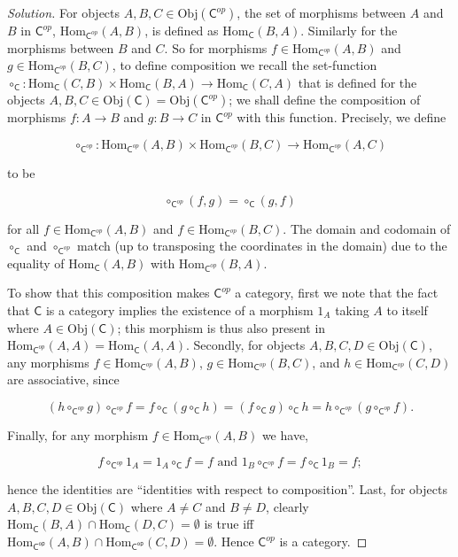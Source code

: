 \documentclass[fontsize=14pt]{scrartcl}
\newenvironment{solution}{
  \begin{proof}[Solution]
  \vspace{-8px}
  \setlength{\parskip}{4px}
  \setlength{\parindent}{0px}
}{
  \end{proof}
}
\newcommand{\Obj}{\mathrm{Obj}}
\newcommand{\Hom}{\mathrm{Hom}}
\begin{document}
\begin{solution}
For objects $A,B,C\in\Obj(\mathsf{C}^{op})$, the set of morphisms between $A$
and $B$ in $\mathsf{C}^{op}$, $\Hom_{\mathsf{C}^{op}}(A,B)$, is defined as
$\Hom_{\mathsf{C}}(B, A)$. Similarly for the morphisms between $B$ and $C$. So
for morphisms $f\in\Hom_{\mathsf{C}^{op}}(A,B)$ and
$g\in\Hom_{\mathsf{C}^{op}}(B,C)$, to define composition we recall the
set-function $\circ_{\mathsf{C}} : \Hom_{\mathsf{C}}(C,B) \times
\Hom_{\mathsf{C}}(B,A) \to\Hom_{\mathsf{C}}(C,A)$ that is defined for the
objects $A,B,C\in\Obj(\mathsf{C})=\Obj(\mathsf{C}^{op})$; we shall define the
composition of morphisms $f:A\to B$ and $g:B\to C$ in $\mathsf{C}^{op}$ with
this function. Precisely, we define

\[ \circ_{\mathsf{C}^{op}}: \Hom_{\mathsf{C}^{op}}(A,B) \times
\Hom_{\mathsf{C}^{op}}(B,C) \to \Hom_{\mathsf{C}^{op}}(A,C) \]

to be

\[ \circ_{\mathsf{C}^{op}}(f,g) = \circ_{\mathsf{C}}(g,f) \]

for all $f\in\Hom_{\mathsf{C}^{op}}(A,B)$ and $f\in\Hom_{\mathsf{C}^{op}}(B,C)$.
The domain and codomain of $\circ_{\mathsf{C}}$ and $\circ_{\mathsf{C}^{op}}$
match (up to transposing the coordinates in the domain) due to the equality of
$\Hom_{\mathsf{C}}(A,B)$ with $\Hom_{\mathsf{C}^{op}}(B,A)$.

To show that this composition makes $\mathsf{C}^{op}$ a category, first we note
that the fact that $\mathsf{C}$ is a category implies the existence of a
morphism $1_{A}$ taking $A$ to itself where $A\in\Obj(\mathsf{C})$; this
morphism is thus also present in $\Hom_{\mathsf{C}^{op}}(A,A) =
\Hom_{\mathsf{C}}(A,A)$. Secondly, for objects $A,B,C,D\in\Obj(\mathsf{C})$, any
morphisms $f\in\Hom_{\mathsf{C}^{op}}(A,B)$, $g\in\Hom_{\mathsf{C}^{op}}(B,C)$,
and $h\in\Hom_{\mathsf{C}^{op}}(C,D)$ are associative, since

\[ (h \circ_{\mathsf{C}^{op}} g) \circ_{\mathsf{C}^{op}} f = f
\circ_{\mathsf{C}} (g \circ_{\mathsf{C}} h) = (f \circ_{\mathsf{C}} g)
\circ_{\mathsf{C}} h = h \circ_{\mathsf{C}^{op}} (g \circ_{\mathsf{C}^{op}} f).
\]

Finally, for any morphism $f\in\Hom_{\mathsf{C}^{op}}(A,B)$ we have,

\[ f \circ_{\mathsf{C}^{op}} 1_A = 1_A \circ_{\mathsf{C}} f = f \text{ and }
1_B \circ_{\mathsf{C}^{op}} f = f \circ_{\mathsf{C}} 1_B = f; \]

hence the identities are ``identities with respect to composition''. Last, for
objects $A,B,C,D\in\Obj(\mathsf{C})$ where $A\neq C$ and $B\neq D$,
clearly $\Hom_{\mathsf{C}}(B,A)\cap\Hom_{\mathsf{C}}(D,C)=\emptyset$ is true iff 
$\Hom_{\mathsf{C^{op}}}(A,B)\cap\Hom_{\mathsf{C^{op}}}(C,D)=\emptyset$. Hence
$\mathsf{C}^{op}$ is a category.
\end{solution}
\end{document}
